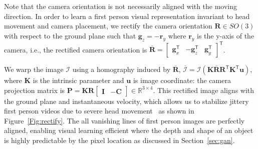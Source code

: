 \documentclass[10pt,twocolumn,letterpaper]{article}
\begin{document}
Note that the camera orientation is not necessarily aligned with the moving direction. In order to learn a first person visual representation invariant to head movement and camera placement, we rectify the camera orientation $\mathbf{R}\in SO(3)$ with respect to the ground plane such that  $\mathbf{g}_z=-\mathbf{r}_y$ where $\mathbf{r}_y$ is the y-axis of the camera, i.e., the rectified camera orientation is $\overline{\mathbf{R}}=\left[\begin{array}{ccc} \mathbf{g}_x^{\mathsf{T}} & -\mathbf{g}_z^{\mathsf{T}} & \mathbf{g}_y^{\mathsf{T}}\end{array}\right]^{\mathsf{T}}$.  




We warp the image $\mathcal{I}$ using a homography induced by $\overline{\mathbf{R}}$, $\overline{\mathcal{I}}=\mathcal{I}(\mathbf{K}\overline{\mathbf{R}}\mathbf{R}^{\mathsf{T}}\mathbf{K}^{\mathsf{T}}\mathbf{u})$, where $\mathbf{K}$ is the intrinsic parameter and $\mathbf{u}$ is image coordinate: the camera projection matrix is $\mathbf{P}=\mathbf{K}\mathbf{R}\left[\begin{array}{cc} \mathbf{I} & -\mathbf{C}\end{array}\right] \in \mathds{R}^{3\times 4}$. This rectified image aligns with the ground plane and instantaneous velocity, which allows us to stabilize jittery first person videos due to severe head movement~\cite{su:2016,park:2016_future} as shown in Figure~\ref{Fig:rectify}. The all vanishing lines of first person images are perfectly aligned, enabling visual learning efficient where the depth and shape of an object is highly predictable by the pixel location as discussed in Section~\ref{sec:gan}.  






\end{document}

